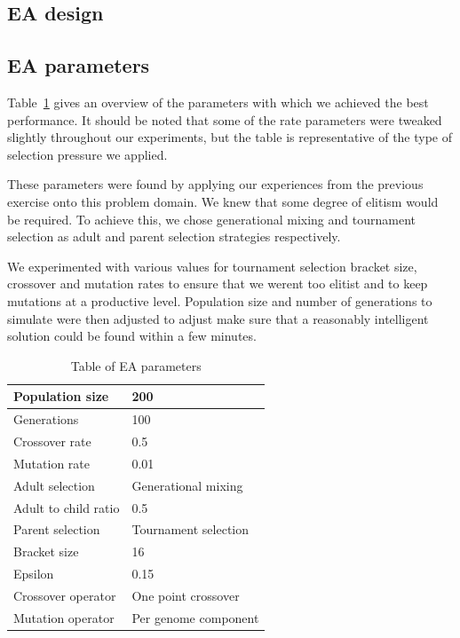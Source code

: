 \documentclass[twoside]{article}
\begin{document}
\begin{multicols}{2} %

  \section{EA design}

  \subsection{EA parameters}

  Table~\ref{tbl:ea-parameters} gives an overview of the parameters with which we achieved the best performance.
  It should be noted that some of the rate parameters were tweaked slightly throughout our experiments, but the table is representative of the type of selection pressure we applied.
  
  These parameters were found by applying our experiences from the previous exercise onto this problem domain.
  We knew that some degree of elitism would be required.
  To achieve this, we chose generational mixing and tournament selection as adult and parent selection strategies respectively.
  
  We experimented with various values for tournament selection bracket size, crossover and mutation rates to ensure that we werent too elitist and to keep mutations at a productive level.
  Population size and number of generations to simulate were then adjusted to adjust make sure that a reasonably intelligent solution could be found within a few minutes.
  
  \begin{table}[H]
    \begin{tabular}{|l|l|}
      \hline
      Population size                   & 200                  \\ \hline
      Generations                       & 100                  \\ \hline
      Crossover rate                    & 0.5                  \\ \hline
      Mutation rate                     & 0.01                 \\ \hline
      Adult selection                   & Generational mixing  \\ \hline
      Adult to child ratio              & 0.5                  \\ \hline
      Parent selection                  & Tournament selection \\ \hline
      Bracket size                      & 16                   \\ \hline
      Epsilon                           & 0.15                 \\ \hline
      Crossover operator                & One point crossover  \\ \hline
      Mutation operator                 & Per genome component \\ \hline
    \end{tabular}
    \caption{Table of EA parameters}
    \label{tbl:ea-parameters}
  \end{table}




\end{multicols}
\end{document}
